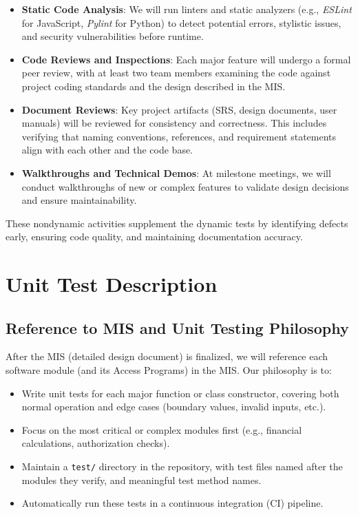 \documentclass[12pt, titlepage]{article}
\begin{document}
\begin{itemize}
    \item \textbf{Static Code Analysis}: We will run linters and static analyzers (e.g., \textit{ESLint} for JavaScript, \textit{Pylint} for Python) to detect potential errors, stylistic issues, and security vulnerabilities before runtime.
    \item \textbf{Code Reviews and Inspections}: Each major feature will undergo a formal peer review, with at least two team members examining the code against project coding standards and the design described in the MIS.
    \item \textbf{Document Reviews}: Key project artifacts (SRS, design documents, user manuals) will be reviewed for consistency and correctness. This includes verifying that naming conventions, references, and requirement statements align with each other and the code base.
    \item \textbf{Walkthroughs and Technical Demos}: At milestone meetings, we will conduct walkthroughs of new or complex features to validate design decisions and ensure maintainability.
\end{itemize}

These nondynamic activities supplement the dynamic tests by identifying defects early, ensuring code quality, and maintaining documentation accuracy.

\section{Unit Test Description}

\subsection{Reference to MIS and Unit Testing Philosophy}
After the MIS (detailed design document) is finalized, we will reference each software module (and its Access Programs) in the MIS. Our philosophy is to:

\begin{itemize}
    \item Write unit tests for each major function or class constructor, covering both normal operation and edge cases (boundary values, invalid inputs, etc.).
    \item Focus on the most critical or complex modules first (e.g., financial calculations, authorization checks).
    \item Maintain a \texttt{test/} directory in the repository, with test files named after the modules they verify, and meaningful test method names.
    \item Automatically run these tests in a continuous integration (CI) pipeline.
\end{itemize}
\end{document}
